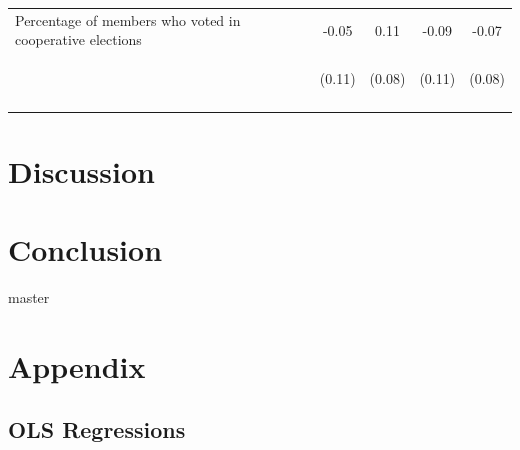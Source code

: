 \documentclass[11pt]{article}
\begin{document}
\begin{table}[H]
{\begin{tabularx}{1.3\linewidth}{lcccc}
\noalign{\smallskip}Percentage of members who voted in cooperative elections & -0.05 & 0.11 & -0.09 & -0.07\\
 & \begin{footnotesize}(0.11)\end{footnotesize} & \begin{footnotesize}(0.08)\end{footnotesize} & \begin{footnotesize}(0.11)\end{footnotesize} & \begin{footnotesize}(0.08)\end{footnotesize}\\
\noalign{\smallskip}\hline
  \end{tabularx}}
\end{table}
\doublespacing




\section{Discussion}

\section{Conclusion}

\newpage
 {master}


\appendix
\setcounter{table}{0}
\setcounter{figure}{0}
\setcounter{equation}{0}
\renewcommand\thetable{\Alph{section}.\arabic{table}}
\renewcommand\thefigure{\Alph{section}.\arabic{figure}}
\renewcommand\theequation{\Alph{section}.\arabic{equation}}%

\newpage
\section{Appendix}

\subsection{OLS Regressions}
\end{document}
